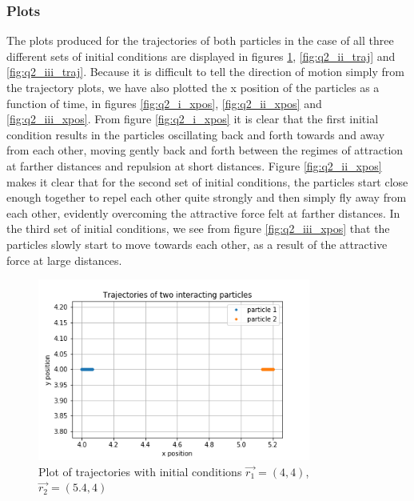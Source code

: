 \documentclass{article}
\begin{document}
\subsubsection{Plots}

The plots produced for the trajectories of both particles in the case of all three different sets of initial conditions are displayed in figures \ref{fig:q2_i_traj}, \ref{fig:q2_ii_traj} and \ref{fig:q2_iii_traj}. Because it is difficult to tell the direction of motion simply from the trajectory plots, we have also plotted the x position of the particles as a function of time, in figures \ref{fig:q2_i_xpos}, \ref{fig:q2_ii_xpos} and \ref{fig:q2_iii_xpos}. From figure \ref{fig:q2_i_xpos} it is clear that the first initial condition results in the particles oscillating back and forth towards and away from each other, moving gently back and forth between the regimes of attraction at farther distances and repulsion at short distances. Figure \ref{fig:q2_ii_xpos} makes it clear that for the second set of initial conditions, the particles start close enough together to repel each other quite strongly and then simply fly away from each other, evidently overcoming the attractive force felt at farther distances. In the third set of initial conditions, we see from figure \ref{fig:q2_iii_xpos} that the particles slowly start to move towards each other, as a result of the attractive force at large distances.

\begin{figure}[H]
	\centering
	\includegraphics[width=0.8\textwidth]{../images/q2_i_traj.png}
	\caption{Plot of trajectories with initial conditions $\vec{r_1}=(4,4)$, $\vec{r_2}=(5.4,4)$}
	\label{fig:q2_i_traj}
\end{figure}
\end{document}
